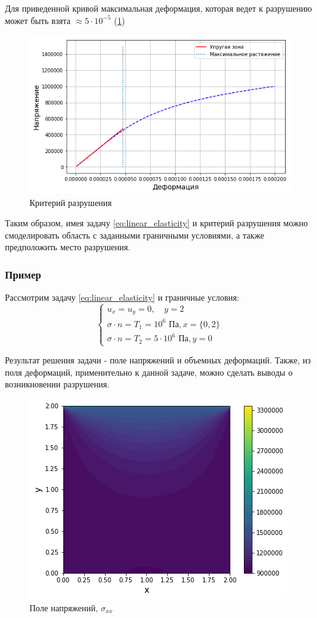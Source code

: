 Для приведенной кривой максимальная деформация, которая ведет к разрушению может быть взята $\approx 5 \cdot 10^{-5}$ (\ref{fig:criterion})

\begin{figure}
	\centering
	\includegraphics[width=0.65 \textwidth]{images/part2/criterion.png}
	\caption{Критерий разрушения}
	\label{fig:criterion}
\end{figure}

Таким образом, имея задачу \eqref{eq:linear_elasticity} и критерий разрушения можно смоделировать область с заданными граничными условиями, а также предположить место разрушения.

\subsubsection{Пример}

Рассмотрим задачу \eqref{eq:linear_elasticity} и граничные условия:
\begin{equation}
	\label{eq:boundary_conditions_2}
	\begin{cases}
		u_x = u_y = 0, \quad y = 2 \\
		\sigma \cdot n = T_1 = 10^6 \text{ Па}, x = \{0, 2\} \\
		\sigma \cdot n = T_2 = 5 \cdot 10^6 \text{ Па}, y = 0
	\end{cases}
\end{equation}

Результат решения задачи - поле напряжений и объемных деформаций. Также, из поля деформаций, применительно к данной задаче, можно сделать выводы о возникновении разрушения.


\begin{figure}
	\centering
	\includegraphics[width=0.65 \textwidth]{images/part2/sigma_xx_1.png}
	\caption{Поле напряжений, $\sigma_{xx}$}
	\label{fig:sigma_xx_1}
\end{figure}

